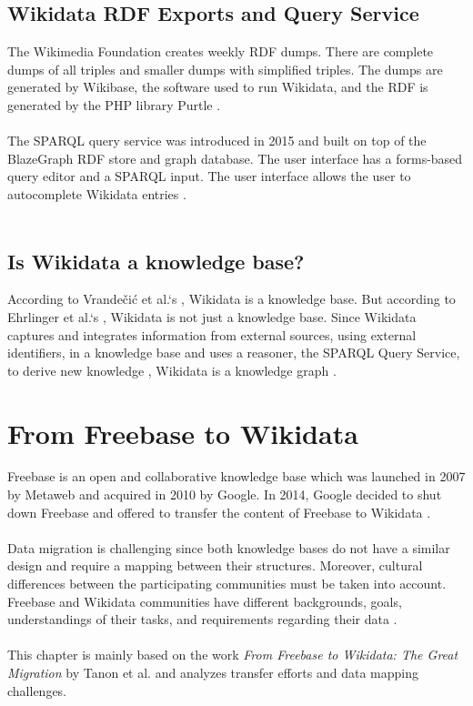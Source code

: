 ﻿\documentclass[11pt,titlepage,oneside,openany]{book}
\begin{document}
\section{Wikidata RDF Exports and Query Service} 
The Wikimedia Foundation creates weekly RDF dumps. There are complete dumps of all triples and smaller dumps with simplified triples. The dumps are generated by Wikibase, the software used to run Wikidata, and the RDF is generated by the PHP library Purtle \cite{Malyshev2018GettingTM}.
\\
\\
The SPARQL query service was introduced in 2015 and built on top of the BlazeGraph RDF store and graph database. The user interface has a forms-based query editor and a SPARQL input. The user interface allows the user to autocomplete Wikidata entries \cite{Malyshev2018GettingTM}. 
\\
\\

\section{Is Wikidata a knowledge base?}
According to Vrandečić et al.`s \cite{AFCK01}, Wikidata is a knowledge base. But according to Ehrlinger et al.`s \cite{TDKG01}, Wikidata is not just a knowledge base. Since Wikidata captures and integrates information from external sources, using external identifiers, in a knowledge base and uses a reasoner, the SPARQL Query Service,  to derive new knowledge \cite{Malyshev2018GettingTM}, Wikidata is a knowledge graph \cite{TDKG01}.

\chapter{From Freebase to Wikidata}
\label{chap:migration}
Freebase is an open and collaborative knowledge base which was launched in 2007 by Metaweb and acquired in 2010 by Google. In 2014, Google decided to shut down Freebase and offered to transfer the content of Freebase to Wikidata \cite{Tanon2016FromFT}. 
\\
\\
Data migration is challenging since both knowledge bases do not have a similar design and require a mapping between their structures. Moreover, cultural differences between the participating communities must be taken into account. Freebase and Wikidata communities have different backgrounds, goals, understandings of their tasks, and requirements regarding their data \cite{Tanon2016FromFT}. 
\\
\\
This chapter is mainly based on the work \textit{From Freebase to Wikidata: The Great Migration} by Tanon et al. \cite{Tanon2016FromFT} and analyzes transfer efforts and data mapping challenges.
\\
\\
\end{document}
